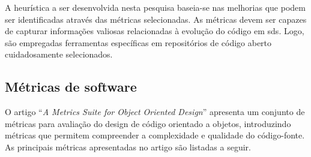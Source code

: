 A heurística a ser desenvolvida nesta pesquisa baseia-se nas melhorias que podem ser identificadas através das métricas selecionadas. As métricas devem ser capazes de capturar informações valiosas relacionadas à evolução do código em \gls{sds}. Logo, são empregadas ferramentas específicas em repositórios de código aberto cuidadosamente selecionados. 

\subsection{Métricas de software} \label{sec:metricasDeSoftware}
O artigo ``\textit{A Metrics Suite for Object Oriented Design}'' \cite{MetricsSuite} apresenta um conjunto de métricas para avaliação do design de código orientado a objetos, introduzindo métricas que permitem compreender a complexidade e qualidade do código-fonte. As principais métricas apresentadas no artigo são listadas a seguir.

